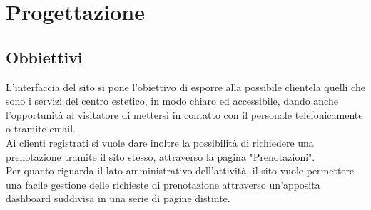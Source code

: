 \documentclass[]{article}
\begin{document}
\section{Progettazione}
\subsection{Obbiettivi}
L'interfaccia del sito si pone l'obiettivo di esporre alla possibile clientela quelli che sono i servizi del centro estetico, in modo chiaro ed accessibile, dando anche l'opportunità al visitatore di mettersi in contatto con il personale telefonicamente o tramite email. \\
Ai clienti registrati si vuole dare inoltre la possibilità di richiedere una prenotazione tramite il sito stesso, attraverso la pagina "Prenotazioni". \\
Per quanto riguarda il lato amministrativo dell'attività, il sito vuole permettere una facile gestione delle richieste di prenotazione attraverso un'apposita dashboard suddivisa in una serie di pagine distinte. \\
\end{document}

